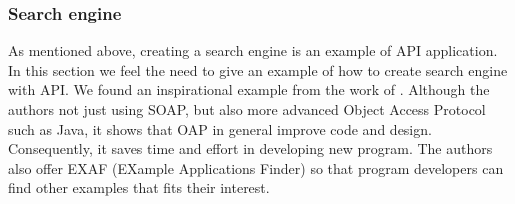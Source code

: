 	\subsubsection{Search engine}
	As mentioned above, creating a search engine is an example of API application. 
	In this section we feel the need to give an example of how to create search engine with API. 
	We found an inspirational example from the work of \cite{Noei2016135}. 
	Although the authors not just using SOAP, but also more advanced Object Access Protocol such as Java, it shows that OAP in general improve code and design. 
	Consequently, it saves time and effort in developing new program.
	The authors also offer EXAF (EXample Applications Finder) so that program developers can find other examples that fits their interest.
	
\newpage %